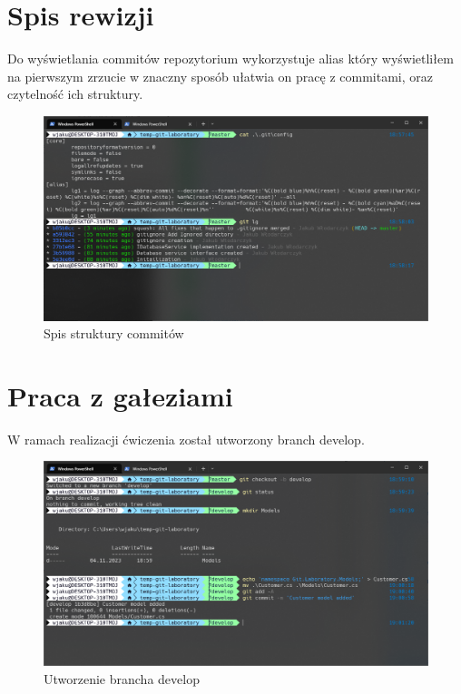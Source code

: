 \documentclass{article}
\begin{document}
\section{Spis rewizji}

Do wyświetlania commitów repozytorium wykorzystuje alias który wyświetliłem na pierwszym zrzucie w znaczny sposób ułatwia on pracę z commitami, oraz czytelność ich struktury. 

\vspace*{\fill}
\begin{figure}[!h]
    \caption{Spis struktury commitów}
    \centerline{\includegraphics [scale=0.5]{readlible-log.PNG}}
    \label{fig:label}
\end{figure}
\vspace*{\fill}
\newpage

\section{Praca z gałeziami}

W ramach realizacji ćwiczenia został utworzony branch develop.

\vspace*{\fill}
\begin{figure}[!h]
    \caption{Utworzenie brancha develop}
    \centerline{\includegraphics [scale=0.5]{customer-model.PNG}}
    \label{fig:label}
\end{figure}
\vspace*{\fill}
\newpage
\end{document}
